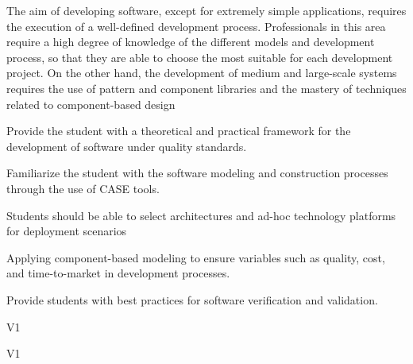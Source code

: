 \begin{syllabus}


\begin{justification}
The aim of developing software, except for extremely simple applications, requires the execution of a well-defined development process.
Professionals in this area require a high degree of knowledge of the different models and development process, so that they are able to choose the most suitable for each development project. On the other hand, the development of medium and large-scale systems requires the use of pattern and component libraries and the mastery of techniques related to component-based design
\end{justification}

\begin{goals}
\item Provide the student with a theoretical and practical framework for the development of software under quality standards.
\item Familiarize the student with the software modeling and construction processes through the use of CASE tools.
\item Students should be able to select architectures and ad-hoc technology platforms for deployment scenarios
\item Applying component-based modeling to ensure variables such as quality, cost, and time-to-market in development processes.
\item Provide students with best practices for software verification and validation.
\end{goals}

\begin{outcomes}{V1}
    \item {}
    \item {}
    \item {}
    \item {}
\end{outcomes}

\begin{competences}{V1}
      \item {} 
      \item {} 
      \item {}
      \item {}
      \item {}
      \item {}
      \item {}
      \item {}
      \item {}
\end{competences}


\end{syllabus}

